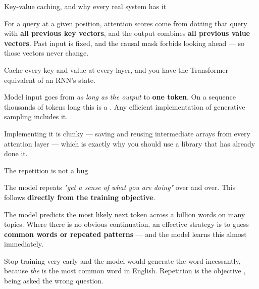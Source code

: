 \documentclass[aspectratio=169,11pt,t]{beamer}
\begin{document}
\begin{frame}[shrink=25]{Key-value caching, and why every real system has it}
{\fontsize{9.4}{12.6}\selectfont\color{fg2}For a query at a given position, attention scores come from dotting that query with \textbf{all previous key vectors}, and the output combines \textbf{all previous value vectors}. Past input is fixed, and the causal mask forbids looking ahead --- so those vectors never change.\par}\vskip 4pt
{\fontsize{9.4}{12.6}\selectfont\color{fg2}Cache every key and value at every layer, and you have the Transformer equivalent of an RNN's state.\par}\vskip 4pt
\begin{iband}[amber]
Model input goes from \textit{as long as the output} to \textbf{one token}. On a sequence thousands of tokens long this is a . Any efficient implementation of generative sampling includes it.
\end{iband}
{\fontsize{9.4}{12.6}\selectfont\color{fg2}Implementing it is clunky --- saving and reusing intermediate arrays from every attention layer --- which is exactly why you should use a library that has already done it.\par}\vskip 4pt
\end{frame}

\begin{frame}[shrink=25]{The repetition is not a bug}
{\fontsize{9.4}{12.6}\selectfont\color{fg2}The model repeats \textit{"get a sense of what you are doing"} over and over. This follows \textbf{directly from the training objective}.\par}\vskip 4pt
{\fontsize{9.4}{12.6}\selectfont\color{fg2}The model predicts the most likely next token across a billion words on many topics. Where there is no obvious continuation, an effective strategy is to guess \textbf{common words or repeated patterns} --- and the model learns this almost immediately.\par}\vskip 4pt
\begin{iband}[signal]
Stop training very early and the model would generate the word  incessantly, because \textit{the} is the most common word in English. Repetition is the objective , being asked the wrong question.
\end{iband}
\end{frame}
\end{document}
